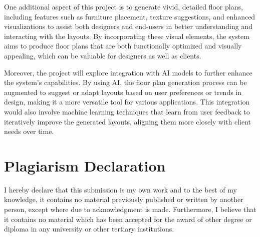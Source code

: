 \documentclass[]{article}
\begin{document}
One additional aspect of this project is to generate vivid, detailed floor plans, including features such as furniture placement, texture suggestions, and enhanced visualizations to assist both designers and end-users in better understanding and interacting with the layouts. By incorporating these visual elements, the system aims to produce floor plans that are both functionally optimized and visually appealing, which can be valuable for designers as well as clients.

Moreover, the project will explore integration with AI models to further enhance the system’s capabilities. By using AI, the floor plan generation process can be augmented to suggest or adapt layouts based on user preferences or trends in design, making it a more versatile tool for various applications. This integration would also involve machine learning techniques that learn from user feedback to iteratively improve the generated layouts, aligning them more closely with client needs over time.

\section{Plagiarism Declaration}
I hereby declare that this submission is my own work and to the best of my knowledge, it contains no material previously published or written by another person, except where due to acknowledgment is made. Furthermore, I believe that it contains no material which has been accepted for the award of other degree or diploma in any university or other tertiary institutions.




\end{document}
